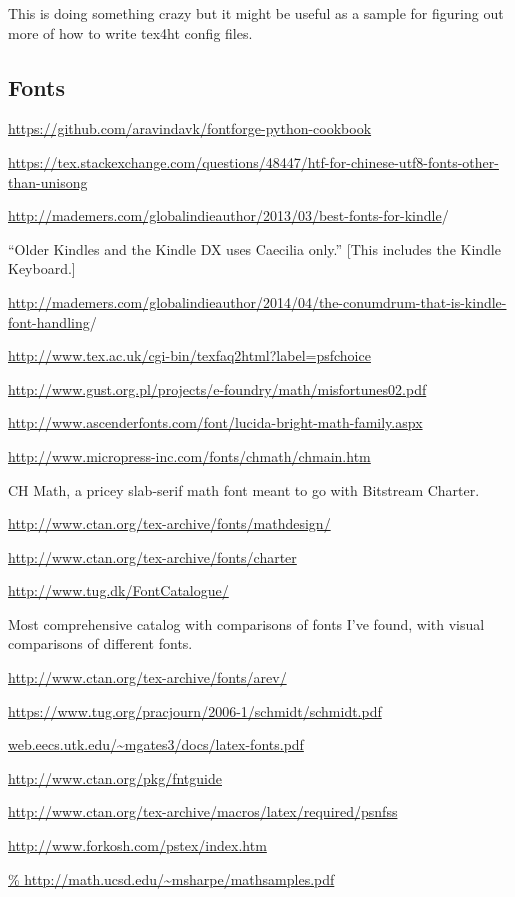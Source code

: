 \documentclass[12pt]{article}
\begin{document}
This is doing something crazy but it might be useful as a sample for
figuring out more of how to write tex4ht config files.


\subsection{Fonts}
\label{sec:fonts_bib}


\url{https://github.com/aravindavk/fontforge-python-cookbook}


\url{https://tex.stackexchange.com/questions/48447/htf-for-chinese-utf8-fonts-other-than-unisong}


\url{http://mademers.com/globalindieauthor/2013/03/best-fonts-for-kindle}/

``Older Kindles and the Kindle DX uses Caecilia only.'' [This includes
the Kindle Keyboard.]

\url{http://mademers.com/globalindieauthor/2014/04/the-conumdrum-that-is-kindle-font-handling}/


\url{http://www.tex.ac.uk/cgi-bin/texfaq2html?label=psfchoice}


\url{http://www.gust.org.pl/projects/e-foundry/math/misfortunes02.pdf}


\url{http://www.ascenderfonts.com/font/lucida-bright-math-family.aspx}

\url{
http://www.micropress-inc.com/fonts/chmath/chmain.htm
}

CH Math, a pricey slab-serif math font meant to go with Bitstream
Charter.

\url{
http://www.ctan.org/tex-archive/fonts/mathdesign/
}

\url{
http://www.ctan.org/tex-archive/fonts/charter
}

\url{
http://www.tug.dk/FontCatalogue/
}

Most comprehensive catalog with comparisons of fonts I've found, with
visual comparisons of different fonts.

\url{
http://www.ctan.org/tex-archive/fonts/arev/
}

\url{
https://www.tug.org/pracjourn/2006-1/schmidt/schmidt.pdf‎
}

\url{
web.eecs.utk.edu/~mgates3/docs/latex-fonts.pdf‎
}

\url{
http://www.ctan.org/pkg/fntguide
}

\url{
http://www.ctan.org/tex-archive/macros/latex/required/psnfss
}

\url{
http://www.forkosh.com/pstex/index.htm
}

\url{%
  http://math.ucsd.edu/~msharpe/mathsamples.pdf
}
\end{document}
